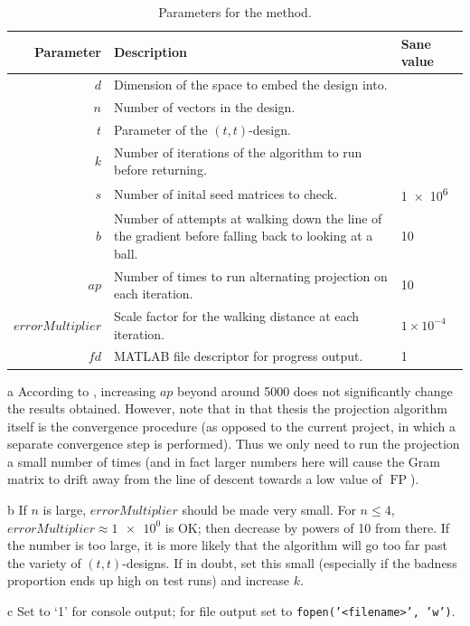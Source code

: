 \documentclass{article}
\DeclareMathOperator{\FP}{FP}
\theoremstyle{definition}
\begin{document}
  \begin{table}
    \begin{threeparttable}
    \begin{tabularx}{\linewidth}{r|X|l}
      \textbf{Parameter} & \textbf{Description} & \textbf{Sane value}\\\hline
      $d$ & Dimension of the space to embed the design into.\\
      $n$ & Number of vectors in the design.\\
      $t$ & Parameter of the $ (t,t)$-design.\\
      $k$ & Number of iterations of the algorithm to run before returning.\\
      $s$ & Number of inital seed matrices to check. & \num{1e6}\\
      $b$ & Number of attempts at walking down the line of the gradient before falling back to looking at a ball. & \num{10}\\
      $ap$ & Number of times to run alternating projection on each iteration. & \num{10}\thinspace\tnote{a}\\
      $errorMultiplier$ & Scale factor for the walking distance at each iteration. & $1\times 10^{-4}$\thinspace\tnote{b}\\
      $fd$ & MATLAB file descriptor for progress output. & 1\thinspace\tnote{c}
    \end{tabularx}
    \begin{tablenotes}\footnotesize
      \item[a] According to \autocite[\S7.2.7]{tropp2004}, increasing $ ap $ beyond around \num{5000} does not significantly
               change the results obtained. However, note that in that thesis the projection algorithm itself is the convergence
               procedure (as opposed to the current project, in which a separate convergence step is performed). Thus we only
               need to run the projection a small number of times (and in fact larger numbers here will cause the Gram matrix
               to drift away from the line of descent towards a low value of $ \FP $).
      \item[b] If $ n $ is large, $ errorMultiplier $ should be made very small. For $ n \leq 4 $,
               $ errorMultiplier \approx \num{1e0} $ is OK; then decrease by powers of 10 from there. If
               the number is too large, it is more likely that the algorithm will go too far past the
               variety of $ (t,t)$-designs. If in doubt, set this small (especially if the badness proportion
               ends up high on test runs) and increase $ k $.
      \item[c] Set to `1' for console output; for file output set to \texttt{fopen('<filename>', 'w')}.
    \end{tablenotes}
    \end{threeparttable}
    \caption{Parameters for the  method.\label{tab:tightframe_params}}
  \end{table}
\end{document}
